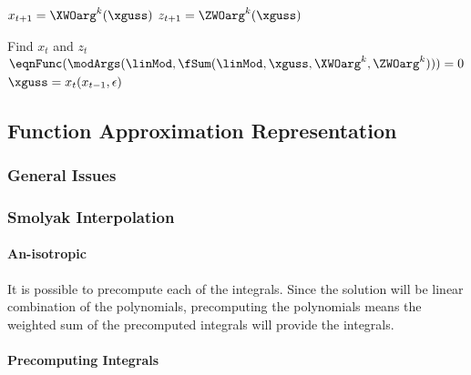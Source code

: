\documentclass[12pt]{article}
\begin{document}
\begin{algorithm}
$x_{t+1}=\XWOarg^k(\xguss)$\;
$z_{t+1}=\ZWOarg^k(\xguss)$\;
\caption{$\fSum(\linMod, \xguss, \XWOarg^k, \ZWOarg^k, N)$} 
\label{fSum}
\end{algorithm}


\begin{algorithm}
Find $x_t$ and $z_t$
$\eqnFunc(\modArgs(\linMod,\fSum(\linMod,\xguss,\XWOarg^k,\ZWOarg^k)))=0$\;
$\xguss=x_t(x_{t-1},\epsilon)$\;
\caption{$\xWOarg^{k+1}(x_{t-1},\epsilon_t)$, $\zWOarg^{k+1}(x_{t-1},\epsilon_t)$}
\label{theSys}
\end{algorithm}


\subsection{Function Approximation Representation}
\label{sec:funcApproxRep}

\subsubsection{General Issues}
\label{sec:generalissues}










\subsubsection{Smolyak Interpolation}
\label{sec:smolyakinterp}

\paragraph{An-isotropic}
It is possible to precompute each of the integrals. Since the solution will be linear combination of the polynomials, precomputing the polynomials means the weighted sum of the precomputed integrals will provide the integrals.
\paragraph{Precomputing Integrals}
\begin{algorithm}
\Input{$\aSmolPoly$, $\smolRngs$, $\distribSpec$} 
\end{algorithm}
\end{document}
